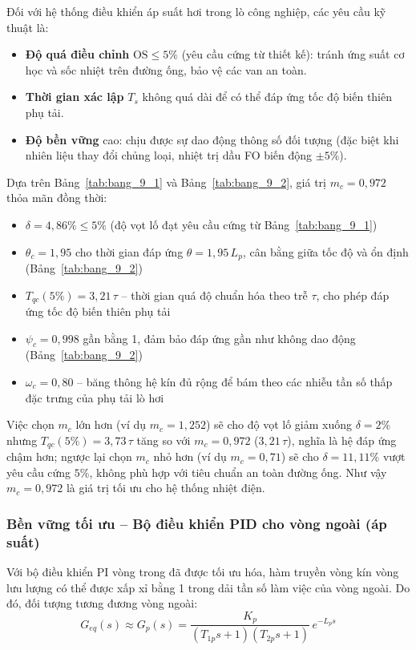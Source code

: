 \documentclass[../main.tex]{subfiles}
\begin{document}
Đối với hệ thống điều khiển áp suất hơi trong lò công nghiệp, các yêu cầu kỹ thuật là:
\begin{itemize}
    \item \textbf{Độ quá điều chỉnh} $\text{OS} \leq 5\%$ (yêu cầu cứng từ thiết kế): tránh ứng suất cơ học và sốc nhiệt trên đường ống, bảo vệ các van an toàn.
    \item \textbf{Thời gian xác lập} $T_s$ không quá dài để có thể đáp ứng tốc độ biến thiên phụ tải.
    \item \textbf{Độ bền vững} cao: chịu được sự dao động thông số đối tượng (đặc biệt khi nhiên liệu thay đổi chủng loại, nhiệt trị dầu FO biến động $\pm 5\%$).
\end{itemize}

Dựa trên Bảng~\ref{tab:bang_9_1} và Bảng~\ref{tab:bang_9_2}, giá trị $m_c = 0{,}972$ thỏa mãn đồng thời:
\begin{itemize}
    \item $\delta = 4{,}86\% \leq 5\%$ (độ vọt lố đạt yêu cầu cứng từ Bảng~\ref{tab:bang_9_1})
    \item $\theta_c = 1{,}95$ cho thời gian đáp ứng $\theta = 1{,}95\,L_p$, cân bằng giữa tốc độ và ổn định (Bảng~\ref{tab:bang_9_2})
    \item $T_{qc}(5\%) = 3{,}21\,\tau$ -- thời gian quá độ chuẩn hóa theo trễ $\tau$, cho phép đáp ứng tốc độ biến thiên phụ tải
    \item $\psi_c = 0{,}998$ gần bằng 1, đảm bảo đáp ứng gần như không dao động (Bảng~\ref{tab:bang_9_2})
    \item $\omega_c = 0{,}80$ -- băng thông hệ kín đủ rộng để bám theo các nhiễu tần số thấp đặc trưng của phụ tải lò hơi
\end{itemize}

Việc chọn $m_c$ lớn hơn (ví dụ $m_c = 1{,}252$) sẽ cho độ vọt lố giảm xuống $\delta = 2\%$ nhưng $T_{qc}(5\%) = 3{,}73\,\tau$ tăng so với $m_c = 0{,}972$ ($3{,}21\,\tau$), nghĩa là hệ đáp ứng chậm hơn; ngược lại chọn $m_c$ nhỏ hơn (ví dụ $m_c = 0{,}71$) sẽ cho $\delta = 11{,}11\%$ vượt yêu cầu cứng $5\%$, không phù hợp với tiêu chuẩn an toàn đường ống. Như vậy $m_c = 0{,}972$ là giá trị tối ưu cho hệ thống nhiệt điện.

\subsubsection{Bền vững tối ưu -- Bộ điều khiển PID cho vòng ngoài (áp suất)}

Với bộ điều khiển PI vòng trong đã được tối ưu hóa, hàm truyền vòng kín vòng lưu lượng có thể được xấp xỉ bằng 1 trong dải tần số làm việc của vòng ngoài. Do đó, đối tượng tương đương vòng ngoài:
\begin{equation}
    G_{eq}(s) \approx G_p(s) = \frac{K_p}{(T_{1p} s + 1)(T_{2p} s + 1)}\, e^{-L_p s}
    \label{eq:equivalent_object}
\end{equation}
\end{document}

